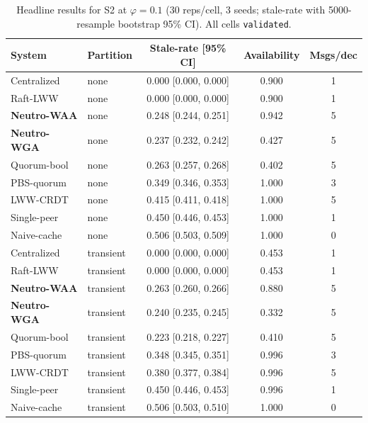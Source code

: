 \begin{table}[t]
\centering
\small
\caption{Headline results for S2 at $\varphi=0.1$ (30 reps/cell, 3 seeds; stale-rate with 5000-resample bootstrap 95\% CI). All cells \texttt{validated}.}
\label{tab:headline-s2}
\begin{tabular}{llccc}
\toprule
System & Partition & Stale-rate [95\% CI] & Availability & Msgs/dec \\
\midrule
Centralized & none & 0.000 [0.000, 0.000] & 0.900 & 1 \\
Raft-LWW & none & 0.000 [0.000, 0.000] & 0.900 & 1 \\
\textbf{Neutro-WAA} & none & 0.248 [0.244, 0.251] & 0.942 & 5 \\
\textbf{Neutro-WGA} & none & 0.237 [0.232, 0.242] & 0.427 & 5 \\
Quorum-bool & none & 0.263 [0.257, 0.268] & 0.402 & 5 \\
PBS-quorum & none & 0.349 [0.346, 0.353] & 1.000 & 3 \\
LWW-CRDT & none & 0.415 [0.411, 0.418] & 1.000 & 5 \\
Single-peer & none & 0.450 [0.446, 0.453] & 1.000 & 1 \\
Naive-cache & none & 0.506 [0.503, 0.509] & 1.000 & 0 \\
Centralized & transient & 0.000 [0.000, 0.000] & 0.453 & 1 \\
Raft-LWW & transient & 0.000 [0.000, 0.000] & 0.453 & 1 \\
\textbf{Neutro-WAA} & transient & 0.263 [0.260, 0.266] & 0.880 & 5 \\
\textbf{Neutro-WGA} & transient & 0.240 [0.235, 0.245] & 0.332 & 5 \\
Quorum-bool & transient & 0.223 [0.218, 0.227] & 0.410 & 5 \\
PBS-quorum & transient & 0.348 [0.345, 0.351] & 0.996 & 3 \\
LWW-CRDT & transient & 0.380 [0.377, 0.384] & 0.996 & 5 \\
Single-peer & transient & 0.450 [0.446, 0.453] & 0.996 & 1 \\
Naive-cache & transient & 0.506 [0.503, 0.510] & 1.000 & 0 \\
\bottomrule
\end{tabular}
\end{table}
